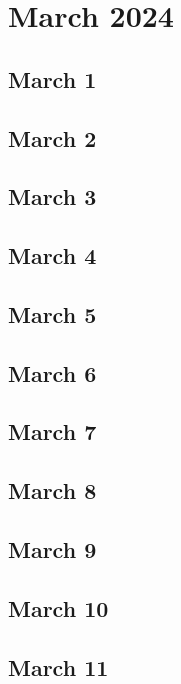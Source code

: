 %
%
%

\chapter{March 2024}
\label{intro} %

\section{March 1}

\section{March 2}

\section{March 3}

\section{March 4}

\section{March 5}

\section{March 6}

\section{March 7}

\section{March 8}

\section{March 9}

\section{March 10}

\section{March 11}

